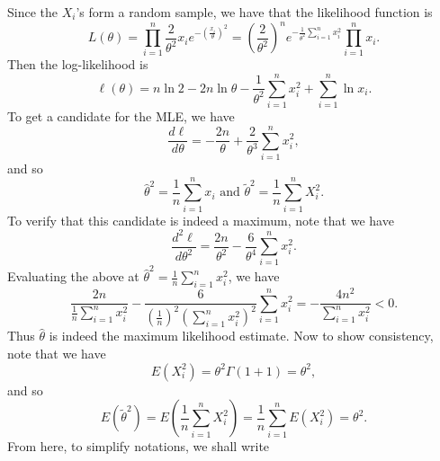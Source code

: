 \documentclass[notoc,notitlepage]{tufte-book}
\begin{document}
\begin{solution}
  Since the $X_i$'s form a random sample, we have that the likelihood function is
  \begin{equation*}
    L(\theta) = \prod_{i=1}^{n} \frac{2}{\theta^2} x_i e^{- \left( \frac{x_i}{\theta} \right)^2} = \left( \frac{2}{\theta^2} \right)^n e^{- \frac{1}{\theta^2} \sum\limits_{i=1}^{n} x_i^2} \prod_{i=1}^{n} x_i.
  \end{equation*}
  Then the log-likelihood is
  \begin{equation*}
    \ell(\theta) = n \ln 2 - 2n \ln \theta - \frac{1}{\theta^2} \sum_{i=1}^{n} x_i^2 + \sum_{i=1}^{n} \ln x_i.
  \end{equation*}
  To get a candidate for the MLE, we have
  \begin{equation*}
    \frac{d \ell}{d \theta} = - \frac{2n}{\theta} + \frac{2}{\theta^3} \sum_{i=1}^{n} x_i^2,
  \end{equation*}
  and so
  \begin{equation*}
    \hat{\theta}^2 = \frac{1}{n} \sum_{i=1}^{n} x_i \text{ and } \tilde{\theta}^2 = \frac{1}{n} \sum_{i=1}^{n} X_i^2.
  \end{equation*}
  To verify that this candidate is indeed a maximum, note that we have
  \begin{equation}\label{eq:eg_6_14_eq1}
    \frac{d^2 \ell}{d \theta^2} = \frac{2n}{\theta^2} - \frac{6}{\theta^4} \sum_{i=1}^{n} x_i^2.
  \end{equation}
  Evaluating the above at $\hat{\theta}^2 = \frac{1}{n} \sum_{i=1}^{n} x_i^2$, we have
  \begin{equation*}
    \frac{2n}{\frac{1}{n} \sum\limits_{i=1}^{n} x_i^2} - \frac{6}{\left(\frac{1}{n}\right)^2 \left( \sum\limits_{i=1}^{n} x_i^2 \right)^2} \sum_{i=1}^{n} x_i^2 = - \frac{4n^2}{\sum\limits_{i=1}^{n} x_i^2} < 0.
  \end{equation*}
  Thus $\hat{\theta}$ is indeed the maximum likelihood estimate. Now to show consistency, note that we have
  \begin{equation*}
    E(X_i^2) = \theta^2 \Gamma(1 + 1) = \theta^2,
  \end{equation*}
  and so
  \begin{equation*}
    E\left( \tilde{\theta}^2 \right) = E\left( \frac{1}{n} \sum_{i=1}^{n} X_i^2 \right) = \frac{1}{n} \sum_{i=1}^{n} E\left(X_i^2\right) = \theta^2.
  \end{equation*}
  From here, to simplify notations, we shall write
  \begin{equation*}

\end{equation*}
\end{solution}
\end{document}
